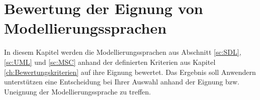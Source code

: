 

\chapter{Bewertung der Eignung von Modellierungssprachen}
\label{ch:BewertungModellierungssprachen}
In diesem Kapitel werden die Modellierungssprachen aus Abschnitt \ref{sc:SDL}, \ref{sc:UML} und \ref{sc:MSC} anhand der definierten Kriterien aus Kapitel \ref{ch:Bewertungskriterien} auf ihre Eignung bewertet. Das Ergebnis soll Anwendern unterstützen eine Entscheidung bei Ihrer Auswahl anhand der Eignung bzw. Uneignung der Modellierungssprache zu treffen.









